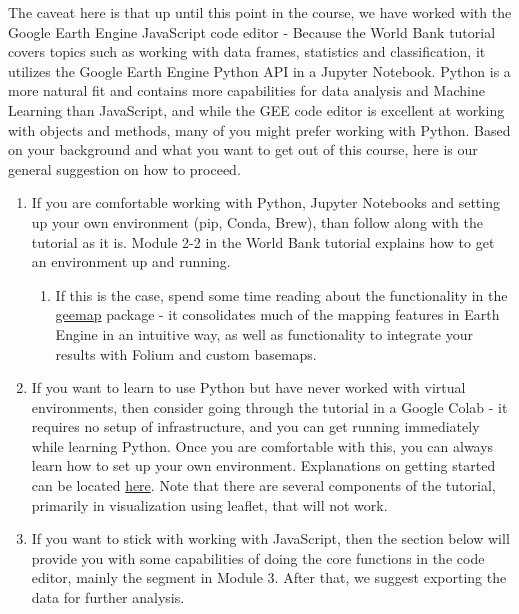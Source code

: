 \documentclass[
]{article}
\providecommand{\tightlist}{%
  \setlength{\itemsep}{0pt}\setlength{\parskip}{0pt}}
\begin{document}
The caveat here is that up until this point in the course, we have worked with the Google Earth Engine JavaScript code editor - Because the World Bank tutorial covers topics such as working with data frames, statistics and classification, it utilizes the Google Earth Engine Python API in a Jupyter Notebook. Python is a more natural fit and contains more capabilities for data analysis and Machine Learning than JavaScript, and while the GEE code editor is excellent at working with objects and methods, many of you might prefer working with Python. Based on your background and what you want to get out of this course, here is our general suggestion on how to proceed.

\begin{enumerate}
\def\labelenumi{\arabic{enumi}.}
\tightlist
\item
  If you are comfortable working with Python, Jupyter Notebooks and setting up your own environment (pip, Conda, Brew), than follow along with the tutorial as it is. Module 2-2 in the World Bank tutorial explains how to get an environment up and running.

  \begin{enumerate}
  \def\labelenumii{\arabic{enumii}.}
  \tightlist
  \item
    If this is the case, spend some time reading about the functionality in the \href{https://geemap.org}{geemap} package - it consolidates much of the mapping features in Earth Engine in an intuitive way, as well as functionality to integrate your results with Folium and custom basemaps.
  \end{enumerate}
\item
  If you want to learn to use Python but have never worked with virtual environments, then consider going through the tutorial in a Google Colab - it requires no setup of infrastructure, and you can get running immediately while learning Python. Once you are comfortable with this, you can always learn how to set up your own environment. Explanations on getting started can be located \href{https://worldbank.github.io/OpenNightLights/tutorials/mod2_3_introduction_to_Jupyter_notebooks.html}{here}. Note that there are several components of the tutorial, primarily in visualization using leaflet, that will not work.
\item
  If you want to stick with working with JavaScript, then the section below will provide you with some capabilities of doing the core functions in the code editor, mainly the segment in Module 3. After that, we suggest exporting the data for further analysis.
\end{enumerate}
\end{document}
